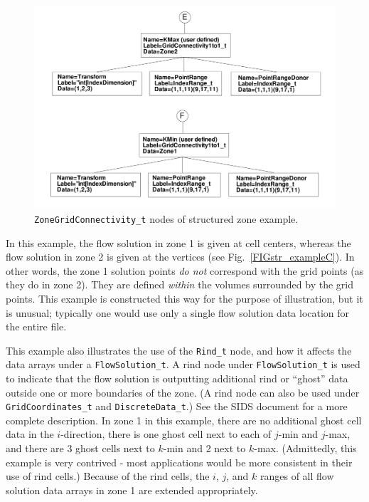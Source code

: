 \documentclass[12pt]{article}
\begin{document}
%
\begin{figure}[hpbt]
\centerline{{\includegraphics[width=150mm]{figures/str_exampleD}}}
\caption{{\tt ZoneGridConnectivity\_t} nodes of structured zone example.}
\label{FIGstr_exampleD}
\end{figure}
%

In this example, the flow solution in zone 1 is given at cell
centers, whereas the flow solution in zone 2 is given at the
vertices (see Fig.~\ref{FIGstr_exampleC}).  
In other words, the zone 1 solution points {\it do not}
correspond with the grid points (as they do in zone 2).  
They are defined {\it within} the volumes surrounded by the
grid points.  This example is constructed this way for the
purpose of illustration, but it is unusual; typically one would use 
only a single flow solution data location
for the entire file.

This example also illustrates the use of the {\tt Rind\_t} node, and how
it affects the data arrays under a {\tt FlowSolution\_t}.  A rind
node under {\tt FlowSolution\_t} is used to indicate that the flow solution is outputting
additional rind or ``ghost'' data outside one or more boundaries
of the zone.  (A rind node can also be used under {\tt GridCoordinates\_t}
and {\tt DiscreteData\_t}.)
See the SIDS document \cite{ALLMARAS} for a more
complete description.  In zone 1 in this example, 
there are no additional ghost cell
data in the $i$-direction, there is one ghost cell next to
each of $j$-min and $j$-max, and there are 3 ghost cells next
to $k$-min and 2 next to $k$-max.  (Admittedly, this example is
very contrived - most applications would be more consistent
in their use of rind cells.)
Because of the rind cells, the $i$, $j$, and $k$ ranges of
all flow solution data arrays in zone 1 are extended appropriately.
\end{document}
